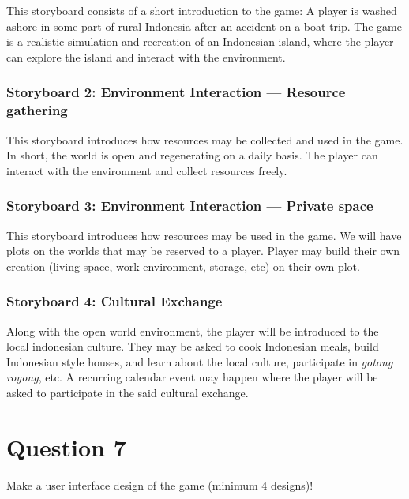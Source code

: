 \documentclass[
  11pt, %
]{assignment}
\begin{document}
This storyboard consists of a short introduction to the game: A player is washed ashore in some part of rural Indonesia after an accident on a boat trip. The game is a realistic simulation and recreation of an Indonesian island, where the player can explore the island and interact with the environment.


\subsubsection*{Storyboard 2: Environment Interaction --- Resource gathering}

This storyboard introduces how resources may be collected and used in the game. In short, the world is open and regenerating on a daily basis. The player can interact with the environment and collect resources freely.


\subsubsection*{Storyboard 3: Environment Interaction --- Private space}

This storyboard introduces how resources may be used in the game. We will have plots on the worlds that may be reserved to a player. Player may build their own creation (living space, work environment, storage, etc) on their own plot.


\subsubsection*{Storyboard 4: Cultural Exchange}

Along with the open world environment, the player will be introduced to the local indonesian culture. They may be asked to cook Indonesian meals, build Indonesian style houses, and learn about the local culture, participate in \textit{gotong royong}, etc. A recurring calendar event may happen where the player will be asked to participate in the said cultural exchange.


\pagebreak
\section*{Question 7}
\begin{problem}
Make a user interface design of the game (minimum 4 designs)!
\end{problem}
\end{document}
